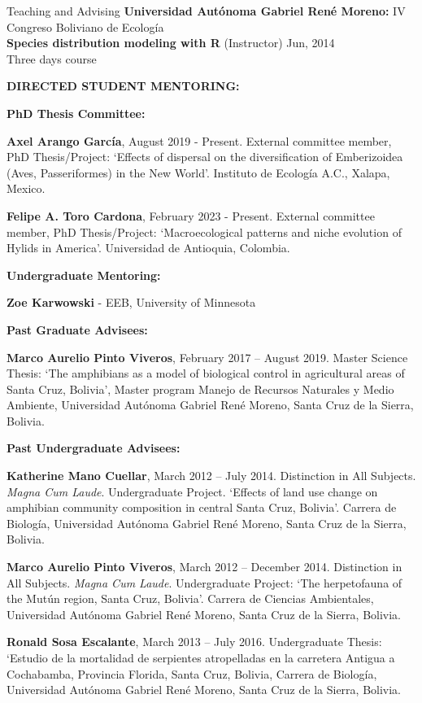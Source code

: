 \documentclass{resume} %
\begin{document}
\begin{rSection}{Teaching and Advising}
{\bf Universidad Autónoma Gabriel René Moreno: }{IV Congreso Boliviano de Ecología } \\
\textbf{Species distribution modeling with R} (Instructor) \hfill Jun, 2014 \\
{Three days course}\smallskip 

\textbf{DIRECTED STUDENT MENTORING:}

\textbf{PhD Thesis Committee:}

\textbf{Axel Arango García}, August 2019 - Present. External committee member, PhD Thesis/Project: `Effects of dispersal on the diversification of Emberizoidea (Aves, Passeriformes) in the New World'. Instituto de Ecología A.C., Xalapa, Mexico. 

\textbf{Felipe A. Toro Cardona}, February 2023 - Present. External committee member, PhD Thesis/Project: `Macroecological patterns and niche evolution of Hylids in America'. Universidad de Antioquia, Colombia. 

\textbf{Undergraduate Mentoring:}

\textbf{Zoe Karwowski} - EEB, University of Minnesota

\textbf{Past Graduate Advisees:}

\textbf{Marco Aurelio Pinto Viveros}, February 2017 – August 2019. Master Science Thesis: `The amphibians as a model of biological control in agricultural areas of Santa Cruz, Bolivia', Master program Manejo de Recursos Naturales y Medio Ambiente, Universidad Autónoma Gabriel René Moreno, Santa Cruz de la Sierra, Bolivia.

\textbf{Past Undergraduate Advisees:}

\textbf{Katherine Mano Cuellar}, March 2012 – July 2014. Distinction in All Subjects. {\em Magna Cum Laude}. Undergraduate Project. `Effects of land use change on amphibian community composition in central Santa Cruz, Bolivia'. Carrera de Biología, Universidad Autónoma Gabriel René Moreno, Santa Cruz de la Sierra, Bolivia.

\textbf{Marco Aurelio Pinto Viveros}, March 2012 – December 2014. Distinction in All Subjects. {\em Magna Cum Laude}. Undergraduate Project: `The herpetofauna of the Mutún region, Santa Cruz, Bolivia'. Carrera de Ciencias Ambientales, Universidad Autónoma Gabriel René Moreno, Santa Cruz de la Sierra, Bolivia.

\textbf{Ronald Sosa Escalante}, March 2013 – July 2016. Undergraduate Thesis: `Estudio de la mortalidad de serpientes atropelladas en la carretera Antigua a Cochabamba, Provincia Florida, Santa Cruz, Bolivia, Carrera de Biología, Universidad Autónoma Gabriel René Moreno, Santa Cruz de la Sierra, Bolivia.

\end{rSection}
\end{document}
